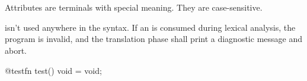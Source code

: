 
\begin{grammar}
\oneof \\

\exactly \\
	 
\end{grammar}

\specsubitem
Attributes are terminals with special meaning. They are case-sensitive.

\specsubitem
{} isn't used anywhere in the syntax. If an
 is consumed during lexical analysis, the program
is invalid, and the translation phase shall print a diagnostic message and
abort.


\begin{codesample}
@testfn test() void = void;
\end{codesample}
